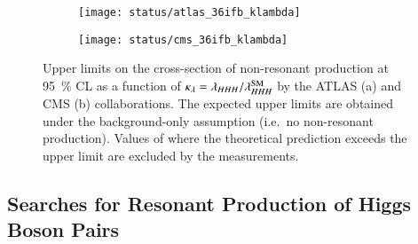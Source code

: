 \begin{figure}[htbp]
  \centering

  \begin{subfigure}[b]{0.48\textwidth}
    \centering

    \texttt{[image: status/atlas\_36ifb\_klambda]}

  \end{subfigure}\hfill%
  \begin{subfigure}[b]{0.48\textwidth}
    \centering

    \texttt{[image: status/cms\_36ifb\_klambda]}

  \end{subfigure}

  \caption{Upper limits on the cross-section of non-resonant \HH production at
    \SI{95}{\percent} CL as a function of
    $\kappa_{\lambda} = \lambda_{HHH} / \lambda_{HHH}^{\text{SM}}$ by the ATLAS (a) and
    CMS (b) collaborations. The expected upper limits are obtained under the
    background-only assumption (i.e.\ no non-resonant \HH production). Values of
    \klambda where the theoretical prediction exceeds the upper limit are
    excluded by the measurements.}%
  \label{fig:prior_status_klambda}
\end{figure}


\subsection{Searches for Resonant Production of Higgs Boson Pairs}%
\label{sec:past_results_resonant}


